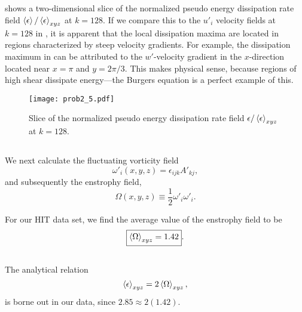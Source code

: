 \documentclass[11pt]{article}
\begin{document}
\subsection{}

 shows a two-dimensional slice of the normalized pseudo energy dissipation rate field $\left< \epsilon \right>/\left< \epsilon \right>_{xyz}$ at $k=128$. If we compare this to the $u'_i$ velocity fields at $k=128$ in , it is apparent that the local dissipation maxima are located in regions characterized by steep velocity gradients. For example, the dissipation maximum in  can be attributed to the $w'$-velocity gradient in the $x$-direction located near $x=\pi$ and $y=2\pi/3$. This makes physical sense, because regions of high shear dissipate energy---the Burgers equation is a perfect example of this.

\begin{figure}[t]
\centering
\texttt{[image: prob2\_5.pdf]}
\\[6pt]
\caption{Slice of the normalized pseudo energy dissipation rate field $\epsilon / \left< \epsilon \right>_{xyz}$ at $k=128$.}
\label{fig:prob_2_5_epsilon_normalized_slice}
\end{figure}

\subsection{}

We next calculate the fluctuating vorticity field
\begin{equation}
\omega'_i(x,y,z)
=
\epsilon_{ijk} A'_{kj}
,
\end{equation}
and subsequently the enstrophy field,
\begin{equation}
\Omega(x,y,z)
\equiv
\frac{1}{2} \omega'_i \omega'_i
.
\end{equation}

For our HIT data set, we find the average value of the enstrophy field to be
\[
\boxed{\left< \Omega \right>_{xyz} = 1.42}
.
\]

\subsection{}

The analytical relation
\[
\left< \epsilon \right>_{xyz} = 2 \left< \Omega \right>_{xyz}
,
\]
is borne out in our data, since $2.85 \approx 2(1.42)$.
\end{document}
